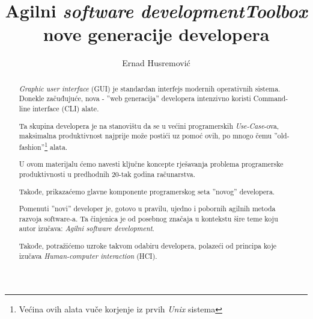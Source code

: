 \documentclass[times, utf8, seminar]{fit}
\begin{document}
\setlength{\parindent}{0pt}


\title{Agilni \emph{software development}\newline \emph{Toolbox} nove generacije developera}

\author{Ernad Husremović}

\maketitle

\tableofcontents

\newpage

\begin{abstract}

\emph{Graphic user interface} (GUI) je standardan interfejs modernih operativnih sistema. Donekle začuđujuće, nova - ''web generacija'' developera intenzivno koristi Command-line interface (CLI) alate. 

Ta skupina developera je na stanovištu da se u većini programerskih \emph{Use-Case}-ova, maksimalna produktivnost najprije može postići uz pomoć ovih, po mnogo čemu ''old-fashion''\footnote{Većina ovih alata vuče korjenje iz prvih \emph{Unix} sistema} alata.
 
U ovom materijalu ćemo navesti ključne koncepte rješavanja problema programerske produktivnosti u predhodnih 20-tak godina računarstva. 

Takođe, prikazaćemo glavne komponente programerskog seta ''novog'' developera. 

Pomenuti ''novi'' developer je, gotovo u pravilu,  ujedno i pobornih agilnih metoda razvoja software-a. Ta činjenica je od posebnog značaja u kontekstu šire teme koju autor izučava: \emph{Agilni software development}.

Takođe, potražićemo uzroke takvom odabiru developera, polazeći od principa koje izučava \emph{Human-computer interaction} (HCI). 

\end{abstract}
\end{document}
